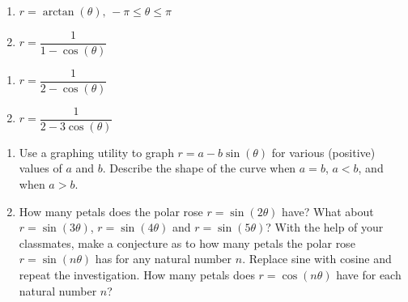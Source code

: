 \documentclass{ximera}
\begin{document}
\begin{multicols}{2} 

\begin{enumerate}

\setcounter{enumi}{\value{HW}}

\item $r = \arctan(\theta), \, -\pi \leq \theta \leq \pi$  
\item $r = \dfrac{1}{1 - \cos(\theta)}$

\setcounter{HW}{\value{enumi}}

\end{enumerate}

\end{multicols}

\begin{multicols}{2} 

\begin{enumerate}

\setcounter{enumi}{\value{HW}}

\item $r = \dfrac{1}{2 - \cos(\theta)}$
\item $r = \dfrac{1}{2 - 3\cos(\theta)}$ \label{polarcalclast}

\setcounter{HW}{\value{enumi}}

\end{enumerate}

\end{multicols}

\begin{enumerate}

\setcounter{enumi}{\value{HW}}

\item  Use a graphing utility to graph  $r = a - b \sin(\theta)$ for various (positive) values of $a$ and $b$.  Describe the shape of the curve when $a = b$, $a < b$, and when $a > b$.


\item How many petals does the polar rose $r = \sin(2\theta)$ have?  What about $r = \sin(3\theta)$, $r = \sin(4\theta)$ and $r = \sin(5\theta)$?  With the help of your classmates, make a conjecture as to how many petals the polar rose $r = \sin(n\theta)$ has for any natural number $n$.  Replace sine with cosine and repeat the investigation.  How many petals does $r = \cos(n\theta)$ have for each natural number $n$?  


\setcounter{HW}{\value{enumi}}

\end{enumerate}
\end{document}
